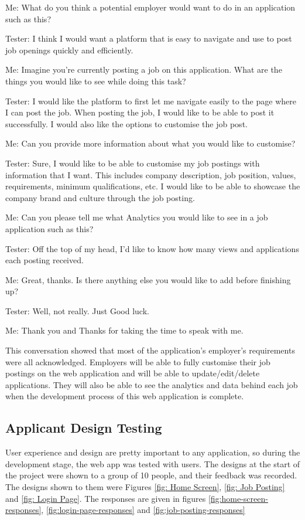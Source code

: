 Me: What do you think a potential employer would want to do in an application such as this?

Tester: I think I would want a platform that is easy to navigate and use to post job openings quickly and efficiently.

Me: Imagine you're currently posting a job on this application. What are the things you would like to see while doing this task?

Tester: I would like the platform to first let me navigate easily to the page where I can post the job. When posting the job, I would like to be able to post it successfully. I would also like the options to customise the job post.

Me: Can you provide more information about what you would like to customise?

Tester: Sure, I would like to be able to customise my job postings with information that I want. This includes company description, job position, values, requirements, minimum qualifications, etc. I would like to be able to showcase the company brand and culture through the job posting.

Me: Can you please tell me what Analytics you would like to see in a job application such as this?

Tester: Off the top of my head, I'd like to know how many views and applications each posting received.

Me: Great, thanks. Is there anything else you would like to add before finishing up?

Tester: Well, not really. Just Good luck.

Me: Thank you and Thanks for taking the time to speak with me.

This conversation showed that most of the application's employer's requirements were all acknowledged. Employers will be able to fully customise their job postings on the web application and will be able to update/edit/delete applications. They will also be able to see the analytics and data behind each job when the development process of this web application is complete.

\subsection{Applicant Design Testing}
User experience and design are pretty important to any application, so during the development stage, the web app was tested with users. The designs at the start of the project were shown to a group of 10 people, and their feedback was recorded. The designs shown to them were Figures \ref{fig: Home Screen}, \ref{fig: Job Posting} and \ref{fig: Login Page}. The responses are given in figures \ref{fig:home-screen-responses}, \ref{fig:login-page-responses} and \ref{fig:job-posting-responses}

